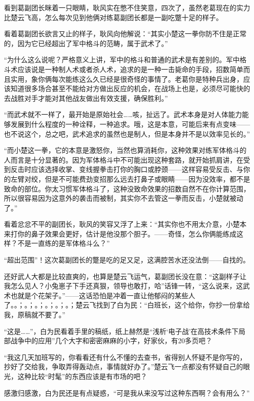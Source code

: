 看到葛副团长眯着一只眼睛，耿风实在憋不住笑意，四次了，虽然老葛现在的实力比楚云飞高，怎么每次见到他俩对练葛副团长都是一副吃蹩十足的样子。

看着葛副团长欲言又止的样子，耿风向他解说：“其实小楚这一拳你防不住是正常的，因为它已经超出了军中格斗的范畴，属于武术了。”

“为什么这么说呢？严格意义上讲，军中的格斗和普通的武术是有差别的。军中格斗术应该说是一种制人术或者杀人术，追求的是一种一击毙命的手段，招数简单而且实用，象你俩每次能练这么久已经是很奇怪的事情了。老葛你是特种兵出身，应该知道很多场合甚至不能给对方做出反应的机会，在战场上也是，必须尽可能快的去战胜对手才能对其他战友做出有效支援，确保胜利。”

“而武术就不一样了，最开始是原始社会……咳，扯远了。武术本身是对人体能力能够发展到什么程度的一种诠释，一种追求。哦，这是本意，可能后来有点变味——也不说这个，总之吧，武术追求的虽然也是制人，但是本身并不是以效率见长的。”

“而小楚这一拳，它的本意是激怒你，当然也算消耗你，这种效果对练军体格斗的人而言是十分显著的。因为军体格斗中不可能出现这种套路，就开始抓肩讲，在受到反击时应该选择收掌、变线握拳击打你的胸口或脖颈——这样容易受反击、与你的左臂对绞，但是不可能费劲变招那么远去打鼻子或眼睛——因为没效率，都不是致命的部位。你太习惯军体格斗了，这种没致命效果的招数自然不在你计算范围，所以很容易因为这意外的袭击而被制，其实你不去管这一拳而反击，小楚就被动了。”

看着忿忿不平的副团长，耿风的笑容又浮了上来：“其实你也不用太介意，小楚本来打你的鼻子效果会更好，估计是他没那个胆子。——奇怪，怎么你俩能练成这样？不是一直练的是军体格斗么？”

“超出范围”！这次葛副团长的蹩是吃的足又足，这满腔苦水还没法倒——自找的。

还好武人大都是比较直爽的，也算是楚云飞运气，葛副团长没在意：“这副样子让我怎么见人？小兔崽子下手还真狠，领导也敢打，哈”话锋一转，“这么说来，这武术也就是个花架子。”——这话恐怕是冲着一直让他郁闷的某些人了。。；。；。；。；。；。；楚云飞找到了白为民：“白班长，这个给你，你抄一份拿给我，原稿就不要了。”

“这是……”，白为民看着手里的稿纸，纸上赫然是“浅析‘电子战’在高技术条件下局部战争中的应用”几个大字和密密麻麻的小字，好家伙，有20多页吧？

“我这几天加班写的，你看看还有什么不懂的去查书，省得别人怀疑不是你写的，抄好了交给我，争取弄得轰动点，事情就好办了。”楚云飞一点都没有怀疑自己的眼光，这种比较“时髦”的东西应该是有市场的吧？

感激归感激，白为民还是有点疑惑，“可是我从来没写过这种东西啊？会有用么？”


